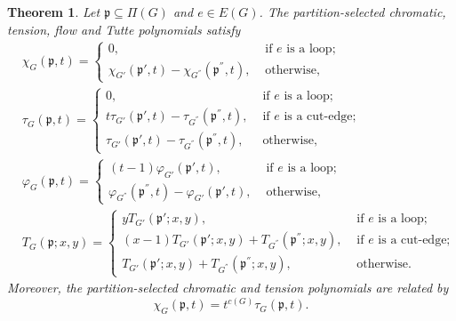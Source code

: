 \documentclass[12pt]{article}%
\numberwithin{equation}{section}
\newtheorem{theorem}{Theorem}[section]
\begin{document}
\begin{theorem}\label{Partition-CTFT-DC}Let $\mathfrak{p}\subseteq\Pi(G)$ and $e\in E(G)$. The partition-selected chromatic, tension, flow and  Tutte polynomials  satisfy
\begin{align}
&\chi_G(\mathfrak{p},t)=\begin{cases} 0,&\text{ if } e \text{ is a loop};\\
\chi_{G'}(\mathfrak{p}',t)-\chi_{G^{''}}(\mathfrak{p}^{''},t),&\text{ otherwise},
\end{cases}\label{Partition-Chromatic-DC}\\
&\tau_G(\mathfrak{p},t)=\begin{cases} 0,&\text{ if } e \text{ is a loop};\\
t\tau_{G'}(\mathfrak{p}',t)-\tau_{G^{''}}(\mathfrak{p}^{''},t),&\text{ if } e \text{ is a cut-edge};\\
\tau_{G'}(\mathfrak{p}',t)-\tau_{G^{''}}(\mathfrak{p}^{''},t),&\text{ otherwise},
\end{cases}\label{Partition-Tension-DC}\\
&\varphi_G(\mathfrak{p},t)=\begin{cases}
 (t-1)\varphi_{G'}(\mathfrak{p}',t),&\text{ if } e \text{ is a loop};\\
\varphi_{G^{''}}(\mathfrak{p}^{''},t)-\varphi_{G'}(\mathfrak{p}',t),&\text{ otherwise},
\end{cases}\label{Partition-Flow-DC}\\
&T_G(\mathfrak{p};x,y)=\begin{cases}
yT_{G'}(\mathfrak{p}';x,y),&\text{ if } e \text{ is a loop};\\
(x-1)T_{G'}(\mathfrak{p}';x,y)+T_{G^{''}}(\mathfrak{p}^{''};x,y),&\text{ if } e \text{ is a cut-edge};\\
T_{G'}(\mathfrak{p}';x,y)+T_{G^{''}}(\mathfrak{p}^{''};x,y),&\text{ otherwise}.
\end{cases}\label{Partition-Tutte-DC}
\end{align}
Moreover, the partition-selected chromatic and tension polynomials are related by 
\[
\chi_G(\mathfrak{p},t)=t^{c(G)}\tau_G(\mathfrak{p},t).
\]
\end{theorem}
\end{document}
